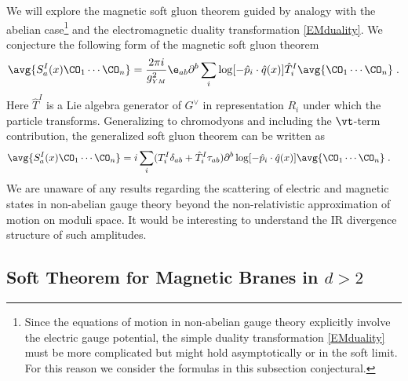 \documentclass[11pt]{article}
\def\d{{\delta}}
\def\p{{\partial}}
\def\ym{{\scriptscriptstyle YM}}
\begin{document}
We will explore the magnetic soft gluon theorem guided by analogy with the abelian case\footnote{Since the equations of motion in non-abelian gauge theory explicitly involve the electric gauge potential, the simple duality transformation \eqref{EMduality} must be more complicated but might hold asymptotically or in the soft limit. For this reason we consider the formulas in this subsection conjectural.   } and the electromagnetic duality transformation \eqref{EMduality}. We conjecture the following form of the magnetic soft gluon theorem
\begin{equation} 
\avg{ S^I_a(x)   \CO_1 \cdots \CO_n } = \frac{2\pi i}{g_{\ym}^2}  \e_{ab} \p^b \sum_i  \log [ - {\hat p}_i \cdot {\hat q}(x) ]  {\hat T}_i^I \avg{   \CO_1 \cdots \CO_n } \; .
\end{equation}
Here ${\hat T}^I$ is a Lie algebra generator of $G^\vee$ in representation $R_i$ under which the particle transforms. Generalizing to chromodyons and including the $\vt$-term contribution, the generalized soft gluon theorem can be written as
\begin{equation}
\begin{split}
\avg{ S^I_a(x) \CO_1 \cdots \CO_n } &=  i \sum_i ( T_i^I \d_{ab}  +  {\hat T}^I_i \tau_{ab} ) \p^b \log [ - {\hat p}_i \cdot {\hat q}(x) ] \avg{ \CO_1 \cdots \CO_n  }  \; .
\end{split}
\end{equation}
We are unaware of any results regarding the scattering of electric and magnetic states in non-abelian gauge theory beyond the non-relativistic approximation of motion on moduli space. It would be interesting to understand the IR divergence structure of such amplitudes. 




\subsection{Soft Theorem for Magnetic Branes in $d>2$}
\label{Sec:MagSoftd}
\end{document}
